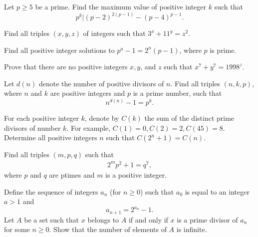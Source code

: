 \documentclass{subfile}
\begin{document}
	\begin{problem}
		Let $p \geq 5$ be a prime. Find the maximum value of positive integer $k$ such that
		\[p^{k}|(p-2)^{2(p-1)}-(p-4)^{p-1}.\]
	\end{problem}



	\begin{problem} %
		Find all triples $(x,y,z)$ of integers such that $3^x+11^y=z^2$.
	\end{problem}

	\begin{problem} %
		Find all positive integer solutions to $p^a-1=2^n(p-1)$, where $p$ is prime.
	\end{problem}

	\begin{problem} %
		Prove that there are no positive integers $x,y$, and $z$ such that $x^7+y^7=1998^z$.
	\end{problem}

	\begin{problem} %
		Let $d(n)$ denote the number of positive divisors of $n$. Find all triples $(n,k,p)$, where $n$ and $k$ are positive integers and $p$ is a prime number, such that
		\[n^{d(n)} - 1 = p^k.\]
	\end{problem}

	\begin{problem}[IZHO 2017] %
		For each positive integer $k$, denote by $C(k)$ the sum of the distinct prime divisors of number $k$. For example, $C(1)=0,C(2)=2,C(45)=8$. Determine all positive integers $n$ such that $C(2^n+1)=C(n)$.
	\end{problem}

	\begin{problem} %
		Find all triples $(m,p,q)$ such that
		\begin{align*} 2^mp^2 +1=q^7, \end{align*}where $p$ and $q$ are ptimes and $m$ is a positive integer.
	\end{problem}

	\begin{problem}[Brazil 2016] %
		Define the sequence of integers $a_n$ (for $n \geq 0$) such that $a_0$ is equal to an integer $a>1$ and $$a_{n+1}=2^{a_n}-1.$$
		Let $A$ be a set such that $x$ belongs to $A$ if and only if $x$ is a prime divisor of $a_n$ for some $n \geq 0$. Show that the number of elements of $A$ is infinite.
	\end{problem}
\end{document}
